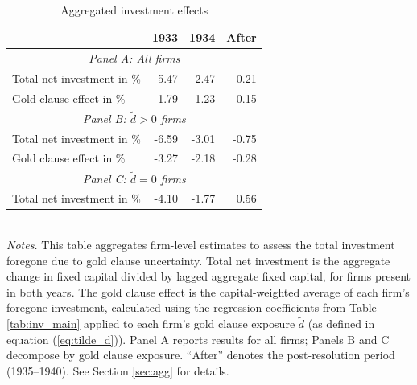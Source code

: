 \begin{table}[p]\centering
    \caption{\\Aggregated investment effects}\footnotesize
    \label{tab:agg}
    \begin{tabular}{lrrr}
    \toprule
    & 1933 & 1934 & After \\
    \midrule
    \multicolumn{4}{c}{\textit{Panel A: All firms}}\\
    \midrule
    Total net investment in \%               & -5.47 & -2.47 & -0.21 \\
    Gold clause effect in \%                 & -1.79 & -1.23 & -0.15 \\
    \midrule
    \multicolumn{4}{c}{\textit{Panel B: $\tilde{d}>0$ firms}}\\
    \midrule
    Total net investment in \%               & -6.59 & -3.01 & -0.75 \\
    Gold clause effect in \%                 & -3.27 & -2.18 & -0.28 \\
    \midrule
    \multicolumn{4}{c}{\textit{Panel C: $\tilde{d}=0$ firms}}\\
    \midrule
    Total net investment in \%                  & -4.10 & -1.77 & 0.56 \\
    \bottomrule
    
    \end{tabular}\\
    
    \vspace*{3mm} \justifying \noindent
    \footnotesize{\textit{Notes.} This table aggregates firm-level estimates to assess the total investment foregone due to gold clause uncertainty. Total net investment is the aggregate change in fixed capital divided by lagged aggregate fixed capital, for firms present in both years. The gold clause effect is the capital-weighted average of each firm's foregone investment, calculated using the regression coefficients from Table \ref{tab:inv_main} applied to each firm's gold clause exposure $\tilde{d}$ (as defined in equation (\ref{eq:tilde_d})). Panel A reports results for all firms; Panels B and C decompose by gold clause exposure. ``After'' denotes the post-resolution period (1935--1940). See Section \ref{sec:agg} for details.}
\end{table}